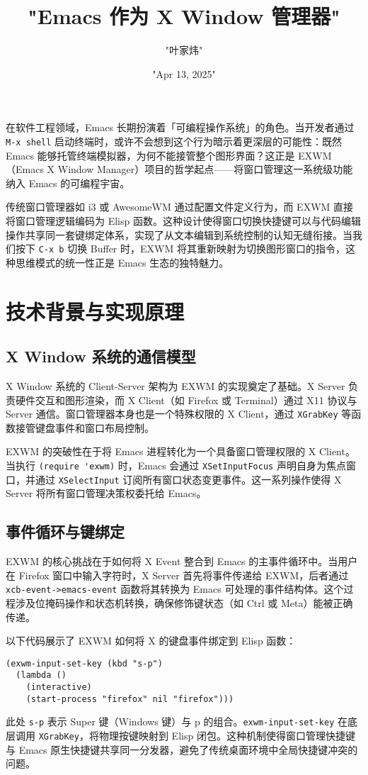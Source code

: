 \title{"Emacs 作为 X Window 管理器"}
\author{"叶家炜"}
\date{"Apr 13, 2025"}
\maketitle
在软件工程领域，Emacs 长期扮演着「可编程操作系统」的角色。当开发者通过 \verb!M-x shell! 启动终端时，或许不会想到这个行为暗示着更深层的可能性：既然 Emacs 能够托管终端模拟器，为何不能接管整个图形界面？这正是 EXWM（Emacs X Window Manager）项目的哲学起点——将窗口管理这一系统级功能纳入 Emacs 的可编程宇宙。\par
传统窗口管理器如 i3 或 AwesomeWM 通过配置文件定义行为，而 EXWM 直接将窗口管理逻辑编码为 Elisp 函数。这种设计使得窗口切换快捷键可以与代码编辑操作共享同一套键绑定体系，实现了从文本编辑到系统控制的认知无缝衔接。当我们按下 \verb!C-x b! 切换 Buffer 时，EXWM 将其重新映射为切换图形窗口的指令，这种思维模式的统一性正是 Emacs 生态的独特魅力。\par
\chapter{技术背景与实现原理}
\section{X Window 系统的通信模型}
X Window 系统的 Client-Server 架构为 EXWM 的实现奠定了基础。X Server 负责硬件交互和图形渲染，而 X Client（如 Firefox 或 Terminal）通过 X11 协议与 Server 通信。窗口管理器本身也是一个特殊权限的 X Client，通过 \verb!XGrabKey! 等函数接管键盘事件和窗口布局控制。\par
EXWM 的突破性在于将 Emacs 进程转化为一个具备窗口管理权限的 X Client。当执行 \verb!(require 'exwm)! 时，Emacs 会通过 \verb!XSetInputFocus! 声明自身为焦点窗口，并通过 \verb!XSelectInput! 订阅所有窗口状态变更事件。这一系列操作使得 X Server 将所有窗口管理决策权委托给 Emacs。\par
\section{事件循环与键绑定}
EXWM 的核心挑战在于如何将 X Event 整合到 Emacs 的主事件循环中。当用户在 Firefox 窗口中输入字符时，X Server 首先将事件传递给 EXWM，后者通过 \verb!xcb-event->emacs-event! 函数将其转换为 Emacs 可处理的事件结构体。这个过程涉及位掩码操作和状态机转换，确保修饰键状态（如 Ctrl 或 Meta）能被正确传递。\par
以下代码展示了 EXWM 如何将 X 的键盘事件绑定到 Elisp 函数：\par
\begin{lstlisting}[language=elisp]
(exwm-input-set-key (kbd "s-p") 
  (lambda ()
    (interactive)
    (start-process "firefox" nil "firefox")))
\end{lstlisting}
此处 \verb!s-p! 表示 Super 键（Windows 键）与 p 的组合。\verb!exwm-input-set-key! 在底层调用 \verb!XGrabKey!，将物理按键映射到 Elisp 闭包。这种机制使得窗口管理快捷键与 Emacs 原生快捷键共享同一分发器，避免了传统桌面环境中全局快捷键冲突的问题。\par
